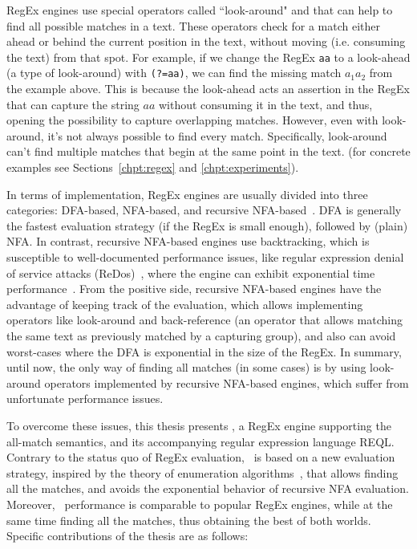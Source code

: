 RegEx engines use special operators called ``look-around" and  that can help to
find all possible matches in a text. These operators check for a match either
ahead or behind the current position in the text, without moving (i.e. consuming
the text) from that spot. For example, if we change the RegEx \texttt{aa} to a
look-ahead (a type of look-around) with \texttt{(?=aa)}, we can find the missing
match $a_1a_2$ from the example above. This is because the look-ahead acts an
assertion in the RegEx that can capture the string $aa$ without consuming it in
the text, and thus, opening the possibility to capture overlapping matches.
However, even with look-around, it's not always possible to find every match.
Specifically, look-around can't find multiple matches that begin at the same
point in the text.  (for concrete examples see Sections~\ref{chpt:regex} and
\ref{chpt:experiments}).

In terms of implementation, RegEx engines are usually divided into three
categories: DFA-based, NFA-based, and recursive NFA-based~\citep{cox2007regular}.
DFA is generally the fastest evaluation strategy (if the RegEx is small enough),
followed by (plain) NFA. In contrast, recursive NFA-based engines use
backtracking, which is susceptible to well-documented performance issues, like
regular expression denial of service attacks (ReDos)~\citep{friedl2006mastering},
where the engine can exhibit exponential time performance~\citep{cox2007regular}.
From the positive side, recursive NFA-based engines have the advantage of
keeping track of the evaluation, which allows implementing operators like
look-around and back-reference (an operator that allows matching the same text
as previously matched by a capturing group), and also can avoid worst-cases
where the DFA is exponential in the size of the RegEx. In summary, until now,
the only way of finding all matches (in some cases) is by using look-around
operators implemented by recursive NFA-based engines, which suffer from
unfortunate performance issues. 

To overcome these issues, this thesis presents \rematch, a RegEx engine
supporting the all-match semantics, and its accompanying regular expression
language REQL. Contrary to the status quo of RegEx evaluation, \rematch\ is
based on a new evaluation strategy, inspired by the theory of enumeration
algorithms~\citep{Segoufin13}, that allows finding all the matches, and avoids
the exponential behavior of recursive NFA evaluation. Moreover, \rematch\
performance is comparable to popular RegEx engines, while at the same time
finding all the matches, thus obtaining the best of both worlds. Specific
contributions of the thesis are as follows:

